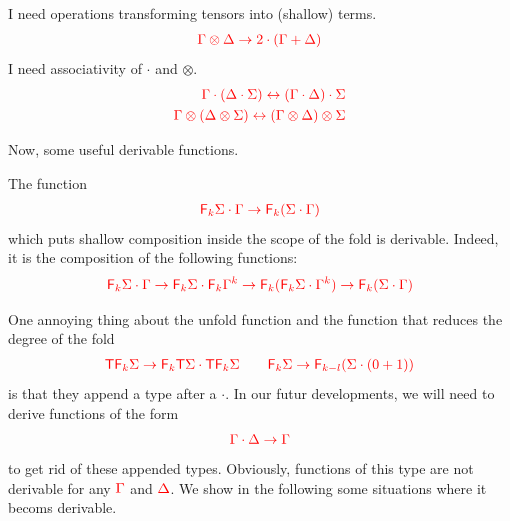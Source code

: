 I need operations transforming tensors into (shallow) terms.
\begin{align*}
{\color{red}{\Gamma\otimes \Delta \to 2\cdot(\Gamma+\Delta)}}
\end{align*}
I need associativity of $\cdot$ and $\otimes$.
\begin{align*}
{\color{red}{\Gamma\cdot(\Delta\cdot\Sigma) \leftrightarrow (\Gamma\cdot\Delta)\cdot\Sigma}}\\
{\color{red}{\Gamma\otimes(\Delta\otimes\Sigma) \leftrightarrow (\Gamma\otimes\Delta)\otimes\Sigma}}
\end{align*}

Now, some useful derivable functions.
\begin{example}\label{ex:PermuteScopeShallowFold}
The function
\begin{align*}
{\color{red}{{\color{red}{\mathsf F_{k}}}\Sigma\cdot \Gamma\to {\color{red}{\mathsf F_{k}}}(\Sigma\cdot \Gamma)}}
\end{align*}
which puts shallow composition inside the scope of the fold is derivable. Indeed, it is the composition of the following functions:
\begin{align*}
{\color{red}{{\color{red}{\mathsf F_{k}}}\Sigma\cdot \Gamma\to {\color{red}{\mathsf F_{k}}}\Sigma\cdot {\color{red}{\mathsf F_{k}}}\Gamma^k\to {\color{red}{\mathsf F_{k}}}({\color{red}{\mathsf F_{k}}}\Sigma\cdot \Gamma^k)\to {\color{red}{\mathsf F_{k}}}(\Sigma\cdot \Gamma)}}
\end{align*} 
\end{example}

One annoying thing about the unfold function and the function that reduces the degree of the fold
\begin{align*}
{\color{red}{{\color{red}{\mathsf T}}{\color{red}{\mathsf F_{k}}}\Sigma \to {\color{red}{\mathsf F_{k}}}{\color{red}{\mathsf T}}\Sigma\cdot  {\color{red}{\mathsf T}}{\color{red}{\mathsf F_{k}}}\Sigma \qquad {\color{red}{\mathsf F_{k}}}\Sigma \to {\color{red}{\mathsf F_{k-l}}}(\Sigma\cdot(0+1))}}
 \end{align*}
 is that they append a type after a $\cdot$. In our futur developments, we will need to derive functions of the form
 \begin{align*}
 {\color{red}{\Gamma\cdot\Delta\to \Gamma}}
 \end{align*}
 to get rid of these appended types. Obviously, functions of this type are not derivable for any ${\color{red}{\Gamma}}$ and ${\color{red}{\Delta}}$. We show in the following some situations where it becoms derivable.
 
